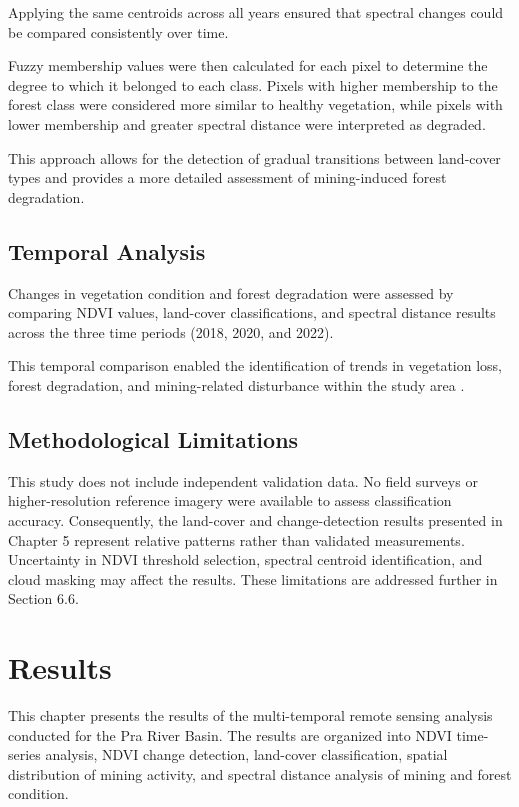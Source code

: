 \documentclass[a4paper,12pt]{report}
\begin{document}
Applying the same centroids across all years ensured that spectral changes could be compared consistently over time.

Fuzzy membership values were then calculated for each pixel to determine the degree to which it belonged to each class. Pixels with higher membership to the forest class were considered more similar to healthy vegetation, while pixels with lower membership and greater spectral distance were interpreted as degraded.

This approach allows for the detection of gradual transitions between land-cover types and provides a more detailed assessment of mining-induced forest degradation.


\section{Temporal Analysis}

Changes in vegetation condition and forest degradation were assessed by comparing NDVI values, land-cover classifications, and spectral distance results across the three time periods (2018, 2020, and 2022).

This temporal comparison enabled the identification of trends in vegetation loss, forest degradation, and mining-related disturbance within the study area \citep{lu2004change,singh1989review}.

\section{Methodological Limitations}

This study does not include independent validation data. No field surveys or higher-resolution reference imagery were available to assess classification accuracy. Consequently, the land-cover and change-detection results presented in Chapter 5 represent relative patterns rather than validated measurements. Uncertainty in NDVI threshold selection, spectral centroid identification, and cloud masking may affect the results. These limitations are addressed further in Section 6.6.

\chapter{Results}

This chapter presents the results of the multi-temporal remote sensing analysis conducted for the Pra River Basin. The results are organized into NDVI time-series analysis, NDVI change detection, land-cover classification, spatial distribution of mining activity, and spectral distance analysis of mining and forest condition.
\end{document}
